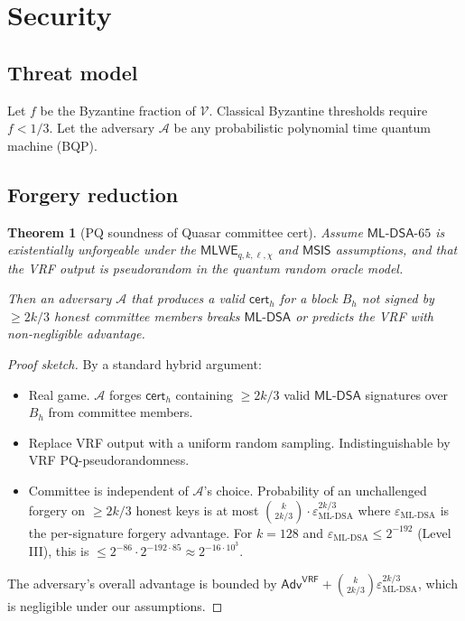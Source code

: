 \documentclass[11pt]{article}
\newtheorem{theorem}{Theorem}
\begin{document}
\section{Security}

\subsection{Threat model}

Let $f$ be the Byzantine fraction of $\mathcal{V}$. Classical Byzantine
thresholds require $f < 1/3$. Let the adversary $\mathcal{A}$ be any
probabilistic polynomial time quantum machine (BQP).

\subsection{Forgery reduction}

\begin{theorem}[PQ soundness of Quasar committee cert]
\label{thm:soundness}
Assume $\mathsf{ML\text{-}DSA}\text{-}65$ is existentially unforgeable under
the $\mathsf{MLWE}_{q,k,\ell,\chi}$ and $\mathsf{MSIS}$ assumptions, and
that the VRF output is pseudorandom in the quantum random oracle model.

Then an adversary $\mathcal{A}$ that produces a valid
$\textsf{cert}_h$ for a block $B_h$ not signed by $\geq 2k/3$ honest
committee members breaks $\mathsf{ML\text{-}DSA}$ or predicts the VRF
with non-negligible advantage.
\end{theorem}

\begin{proof}[Proof sketch]
By a standard hybrid argument:
\begin{itemize}
  \item[\textbf{H0:}] Real game. $\mathcal{A}$ forges $\textsf{cert}_h$
        containing $\geq 2k/3$ valid $\mathsf{ML\text{-}DSA}$ signatures
        over $B_h$ from committee members.
  \item[\textbf{H1:}] Replace VRF output with a uniform random sampling.
        Indistinguishable by VRF PQ-pseudorandomness.
  \item[\textbf{H2:}] Committee is independent of $\mathcal{A}$'s choice.
        Probability of an unchallenged forgery on $\geq 2k/3$ honest
        keys is at most $\binom{k}{2k/3} \cdot \varepsilon_{\text{ML-DSA}}^{2k/3}$
        where $\varepsilon_{\text{ML-DSA}}$ is the per-signature forgery
        advantage. For $k = 128$ and $\varepsilon_{\text{ML-DSA}} \leq 2^{-192}$
        (Level III), this is $\leq 2^{-86} \cdot 2^{-192 \cdot 85} \approx 2^{-16 \cdot 10^3}$.
\end{itemize}
The adversary's overall advantage is bounded by
$\mathsf{Adv}^{\textsf{VRF}} + \binom{k}{2k/3} \varepsilon_{\text{ML-DSA}}^{2k/3}$,
which is negligible under our assumptions.
\end{proof}
\end{document}
